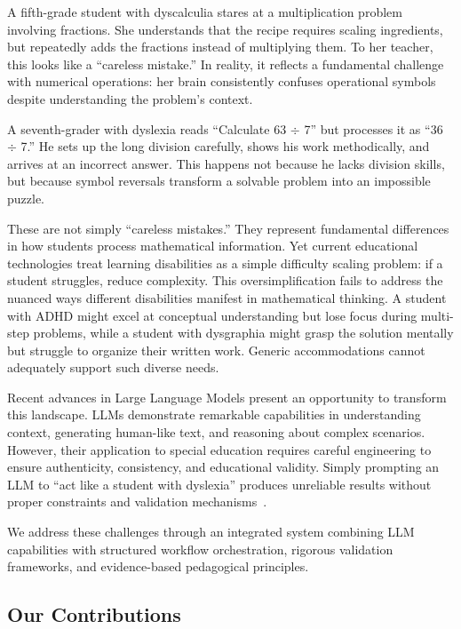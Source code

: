 \documentclass[11pt]{article}
\begin{document}
A fifth-grade student with dyscalculia stares at a multiplication problem involving fractions. She understands that the recipe requires scaling ingredients, but repeatedly adds the fractions instead of multiplying them. To her teacher, this looks like a ``careless mistake.'' In reality, it reflects a fundamental challenge with numerical operations: her brain consistently confuses operational symbols despite understanding the problem's context.

A seventh-grader with dyslexia reads ``Calculate 63 $\div$ 7'' but processes it as ``36 $\div$ 7.'' He sets up the long division carefully, shows his work methodically, and arrives at an incorrect answer. This happens not because he lacks division skills, but because symbol reversals transform a solvable problem into an impossible puzzle.

These are not simply ``careless mistakes.'' They represent fundamental differences in how students process mathematical information. Yet current educational technologies treat learning disabilities as a simple difficulty scaling problem: if a student struggles, reduce complexity. This oversimplification fails to address the nuanced ways different disabilities manifest in mathematical thinking. A student with ADHD might excel at conceptual understanding but lose focus during multi-step problems, while a student with dysgraphia might grasp the solution mentally but struggle to organize their written work. Generic accommodations cannot adequately support such diverse needs.

Recent advances in Large Language Models present an opportunity to transform this landscape. LLMs demonstrate remarkable capabilities in understanding context, generating human-like text, and reasoning about complex scenarios. However, their application to special education requires careful engineering to ensure authenticity, consistency, and educational validity. Simply prompting an LLM to ``act like a student with dyslexia'' produces unreliable results without proper constraints and validation mechanisms~\cite{ref11,ref12}.

We address these challenges through an integrated system combining LLM capabilities with structured workflow orchestration, rigorous validation frameworks, and evidence-based pedagogical principles.

\subsection{Our Contributions}\label{subsec:contributions}
\end{document}
